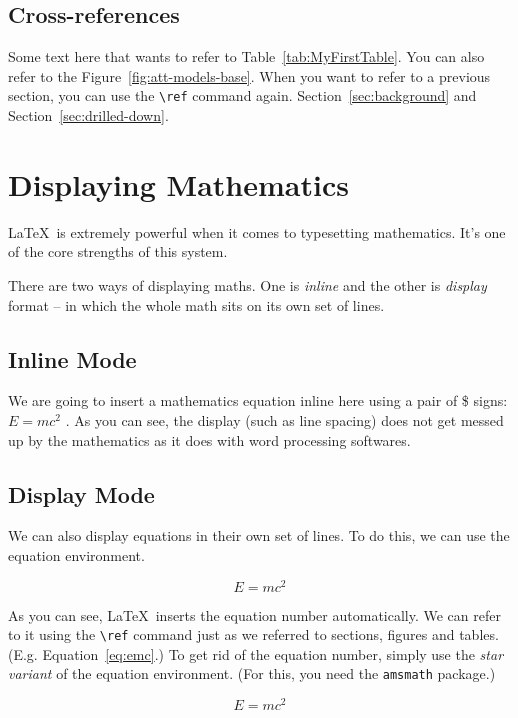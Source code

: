 \documentclass[twocolumn]{article}
\begin{document}
\subsection{Cross-references} 
Some text here that wants to refer to Table~\ref{tab:MyFirstTable}. You can also refer to the Figure~\ref{fig:att-models-base}. When you want to refer to a previous section, you can use the \Verb|\ref| command again. Section~\ref{sec:background} and Section~\ref{sec:drilled-down}. 

 


\section{Displaying Mathematics}

\LaTeX\ is extremely powerful when it comes to typesetting mathematics. It's one of the core strengths of this system. 

There are two ways of displaying maths. One is \emph{inline} and the other is \emph{display} format -- in which the whole math sits on its own set of lines.


\subsection{Inline Mode}
We are going to insert a mathematics equation inline here using a pair of \$ signs: $E=mc^2$   . As you can see, the display (such as line spacing) does not get messed up by the mathematics as it does with word processing softwares. 

\subsection{Display Mode}
We can also display equations in their own set of lines. To do this, we can use the equation environment. 

\begin{equation}\label{eq:emc}
E=mc^2
\end{equation}

As you can see, \LaTeX\ inserts the equation number automatically. We can refer to it using the \Verb|\ref| command just as we referred to sections, figures and tables. (E.g. Equation~\ref{eq:emc}.) To get rid of the equation number, simply use the \emph{star variant} of the equation environment. (For this, you need the \texttt{amsmath} package.)

\begin{equation*}
E=mc^2
\end{equation*}
\end{document}
